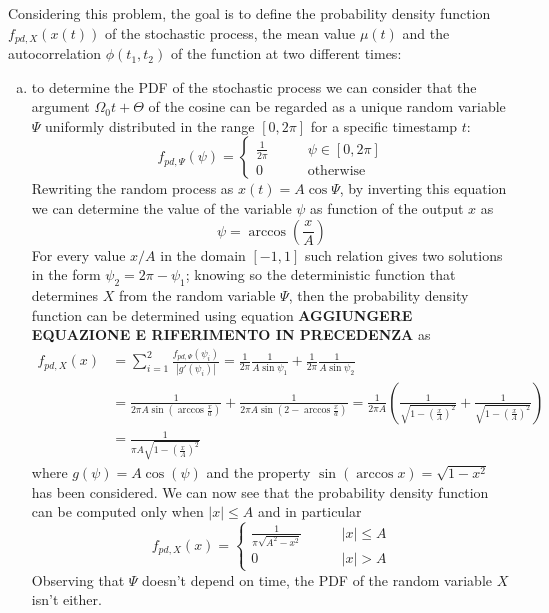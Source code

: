 	Considering this problem, the goal is to define the probability density function $f_{pd,X}(x(t))$ of the stochastic process, the mean value $\mu(t)$ and the autocorrelation $\phi(t_1,t_2)$ of the function at two different times:
	\begin{enumerate}[a)]
		\item to determine the PDF of the stochastic process we can consider that the argument $\Omega_0 t + \Theta$ of the cosine can be regarded as a unique random variable $\Psi$ uniformly distributed in the range $[0,2\pi]$ for a specific timestamp $t$:
		\[ f_{pd,\Psi}(\psi) = \begin{cases}
			\frac 1 {2\pi} \qquad & \psi\in[0,2\pi] \\ 0 & \textrm{otherwise}
		\end{cases} \]
		Rewriting the random process as $x(t) = A \cos\Psi$, by inverting this equation we can determine the value of the variable $\psi$ as function of the output $x$ as
		\[ \psi= \arccos \left(\frac x A\right) \]
		For every value $x/A$ in the domain $[-1,1]$ such relation gives two solutions in the form $\psi_2 = 2\pi - \psi_1$; knowing so the deterministic function that determines $X$ from the random variable $\Psi$, then the probability density function can be determined using equation \textbf{AGGIUNGERE EQUAZIONE E RIFERIMENTO IN PRECEDENZA} as
		\begin{align*}
			f_{pd,X}(x) & = \sum_{i=1}^2  \frac{f_{pd,\Psi}(\psi_i)}{|g'(\psi_i)|} = \frac 1 {2\pi} \frac{1}{A \sin \psi_1} + \frac 1 {2\pi} \frac{1}{A \sin \psi_2} \\
			& = \frac{1}{2\pi A \sin\left(\arccos \frac x a\right)} + \frac{1}{2\pi A \sin\left(2 -\arccos \frac x a\right)} 
			= \frac1{2\pi A} \left( \frac 1 {\sqrt{1- \left( \frac x A \right)^2 }} + \frac 1 {\sqrt{1- \left( \frac x A \right)^2 }} \right) \\ & = \frac 1 {\pi A\sqrt{1- \left( \frac x A \right)^2 }}
		\end{align*}
		where $g(\psi) = A  \cos(\psi)$ and the property $\sin(\arccos x) = \sqrt{1-x^2}$ has been considered. We can now see that the probability density function can be computed  only when $|x|\leq A$ and in particular
		\[ f_{pd,X}(x) = \begin{cases}
			\frac 1 {\pi \sqrt{A^2-x^2}} \qquad & |x| \leq A \\
			0 & |x|>A
		\end{cases} \]
		Observing that $\Psi$ doesn't depend on time, the PDF of the random variable $X$ isn't either.
		

\end{enumerate}
